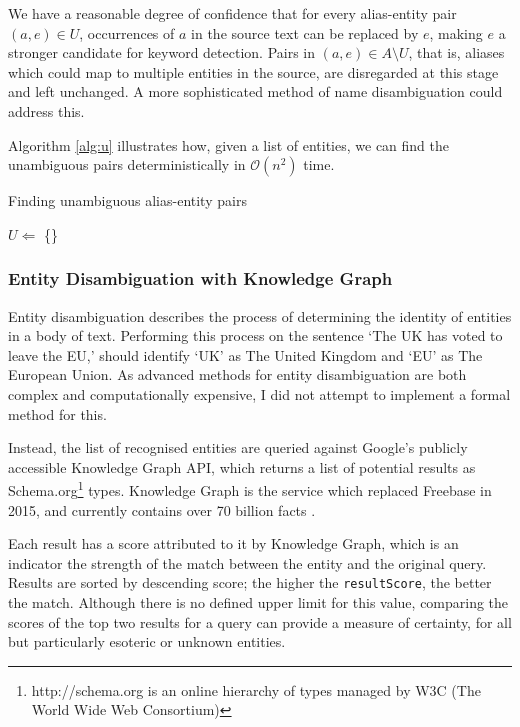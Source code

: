 We have a reasonable degree of confidence that for every alias-entity pair $(a, e) \in U$, occurrences of $a$ in the source text can be replaced by $e$, making $e$ a stronger candidate for keyword detection. Pairs in $(a, e) \in A\setminus{U}$, that is, aliases which could map to multiple entities in the source, are disregarded at this stage and left unchanged. A more sophisticated method of name disambiguation could address this.

Algorithm \ref{alg:u} illustrates how, given a list of entities, we can find the unambiguous pairs deterministically in $\mathcal{O}(n^2)$ time. 

\begin{algorithm}
\label{alg:u}
 \caption{Finding unambiguous alias-entity pairs}
 $U \Leftarrow$ \{\}\;
\end{algorithm}


\subsubsection{Entity Disambiguation with Knowledge Graph}

Entity disambiguation describes the process of determining the identity of entities in a body of text. Performing this process on the sentence `The UK has voted to leave the EU,' should identify `UK' as The United Kingdom and `EU' as The European Union. As advanced methods for entity disambiguation are both complex and computationally expensive, I did not attempt to implement a formal method for this. 

Instead, the list of recognised entities are queried against Google's publicly accessible Knowledge Graph API, which returns a list of potential results as Schema.org\footnote{http://schema.org is an online hierarchy of types managed by W3C (The World Wide Web Consortium)} types. Knowledge Graph is the service which replaced Freebase in 2015, and currently contains over 70 billion facts \citep{knowledgegraph}.

Each result has a score attributed to it by Knowledge Graph, which is an indicator the strength of the match between the entity and the original query. Results are sorted by descending score; the higher the \texttt{resultScore}, the better the match. Although there is no defined upper limit for this value, comparing the scores of the top two results for a query can provide a measure of certainty, for all but particularly esoteric or unknown entities.

